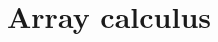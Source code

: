 \documentclass[preprint,acmsmall]{acmart}
\begin{document}
\title{Array calculus}


\maketitle






\clearpage
\end{document}
